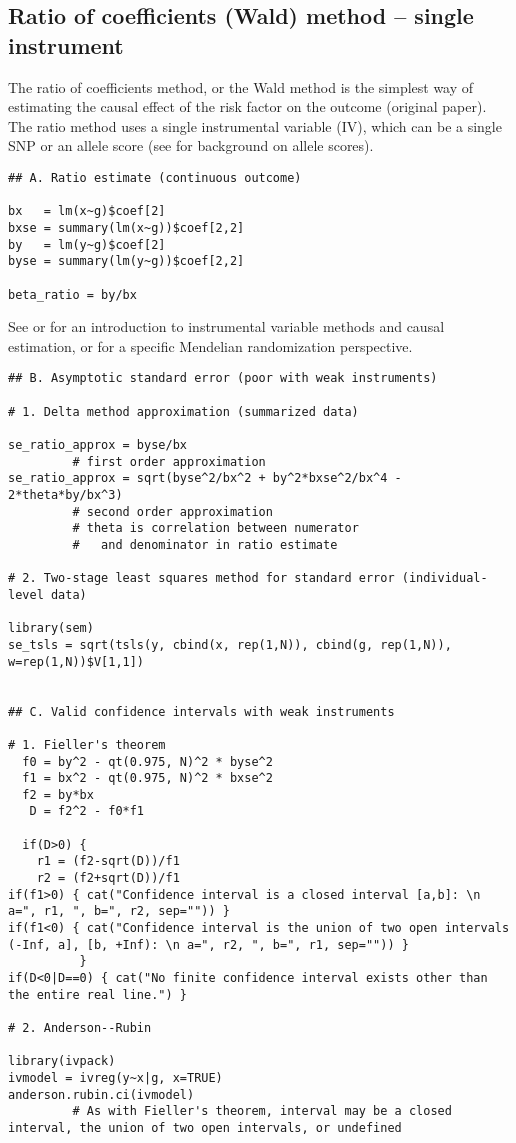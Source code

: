 \documentclass[a4paper,12pt]{article} %
\begin{document}
\subsection{Ratio of coefficients (Wald) method -- single instrument}
The ratio of coefficients method, or the Wald method is the simplest way of estimating the causal effect of the risk factor on the outcome (original paper). The ratio method uses a single instrumental variable (IV), which can be a single SNP or an allele score (see \cite{burgess2012score} for background on allele scores).

\begin{lstlisting}
## A. Ratio estimate (continuous outcome)

bx   = lm(x~g)$coef[2]
bxse = summary(lm(x~g))$coef[2,2]
by   = lm(y~g)$coef[2]
byse = summary(lm(y~g))$coef[2,2]

beta_ratio = by/bx
\end{lstlisting}

See \cite{greenland2000} or \cite{martens2006} for an introduction to instrumental variable methods and causal estimation, or \cite{lawlor2007} for a specific Mendelian randomization perspective.

\begin{lstlisting}
## B. Asymptotic standard error (poor with weak instruments)

# 1. Delta method approximation (summarized data)

se_ratio_approx = byse/bx
         # first order approximation
se_ratio_approx = sqrt(byse^2/bx^2 + by^2*bxse^2/bx^4 - 2*theta*by/bx^3)
         # second order approximation
         # theta is correlation between numerator
         #   and denominator in ratio estimate

# 2. Two-stage least squares method for standard error (individual-level data)

library(sem)
se_tsls = sqrt(tsls(y, cbind(x, rep(1,N)), cbind(g, rep(1,N)), w=rep(1,N))$V[1,1])


## C. Valid confidence intervals with weak instruments

# 1. Fieller's theorem
  f0 = by^2 - qt(0.975, N)^2 * byse^2
  f1 = bx^2 - qt(0.975, N)^2 * bxse^2
  f2 = by*bx
   D = f2^2 - f0*f1

  if(D>0) {
    r1 = (f2-sqrt(D))/f1
    r2 = (f2+sqrt(D))/f1
if(f1>0) { cat("Confidence interval is a closed interval [a,b]: \n a=", r1, ", b=", r2, sep="")) }
if(f1<0) { cat("Confidence interval is the union of two open intervals (-Inf, a], [b, +Inf): \n a=", r2, ", b=", r1, sep="")) }
          }
if(D<0|D==0) { cat("No finite confidence interval exists other than the entire real line.") }

# 2. Anderson--Rubin

library(ivpack)
ivmodel = ivreg(y~x|g, x=TRUE)
anderson.rubin.ci(ivmodel)
         # As with Fieller's theorem, interval may be a closed interval, the union of two open intervals, or undefined
\end{lstlisting}
\end{document}
